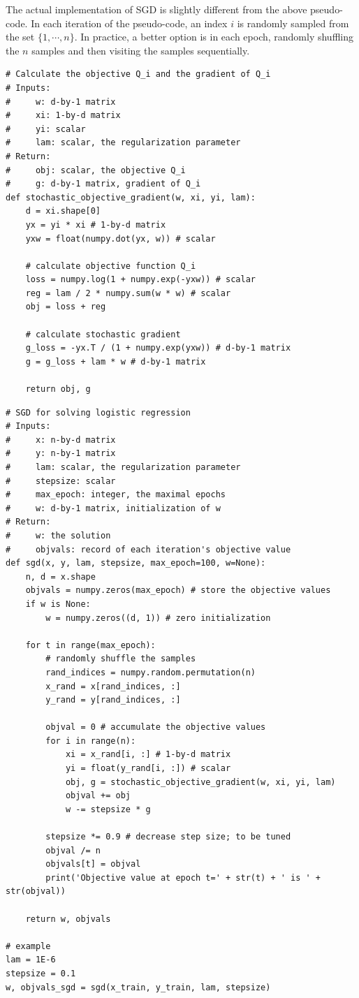 \documentclass[11pt]{article}
\numberwithin{equation}{section}
\begin{document}
The actual implementation of SGD is slightly different from the above pseudo-code.
In each iteration of the pseudo-code, an index $i$ is randomly sampled from the set $\{ 1, \cdots , n \}$.
In practice, a better option is in each epoch, randomly shuffling the $n$ samples and then visiting the samples sequentially.




\vspace{3mm}
\begin{lstlisting}
# Calculate the objective Q_i and the gradient of Q_i
# Inputs:
#     w: d-by-1 matrix
#     xi: 1-by-d matrix
#     yi: scalar
#     lam: scalar, the regularization parameter
# Return:
#     obj: scalar, the objective Q_i
#     g: d-by-1 matrix, gradient of Q_i
def stochastic_objective_gradient(w, xi, yi, lam):
	d = xi.shape[0]
	yx = yi * xi # 1-by-d matrix
	yxw = float(numpy.dot(yx, w)) # scalar
	
	# calculate objective function Q_i
	loss = numpy.log(1 + numpy.exp(-yxw)) # scalar
	reg = lam / 2 * numpy.sum(w * w) # scalar
	obj = loss + reg
	
	# calculate stochastic gradient
	g_loss = -yx.T / (1 + numpy.exp(yxw)) # d-by-1 matrix
	g = g_loss + lam * w # d-by-1 matrix
	
	return obj, g
\end{lstlisting}
\vspace{3mm}



\vspace{1mm}
\begin{lstlisting}
# SGD for solving logistic regression
# Inputs:
#     x: n-by-d matrix
#     y: n-by-1 matrix
#     lam: scalar, the regularization parameter
#     stepsize: scalar
#     max_epoch: integer, the maximal epochs
#     w: d-by-1 matrix, initialization of w
# Return:
#     w: the solution
#     objvals: record of each iteration's objective value
def sgd(x, y, lam, stepsize, max_epoch=100, w=None):
	n, d = x.shape
	objvals = numpy.zeros(max_epoch) # store the objective values
	if w is None:
		w = numpy.zeros((d, 1)) # zero initialization
	
	for t in range(max_epoch):
		# randomly shuffle the samples
		rand_indices = numpy.random.permutation(n)
		x_rand = x[rand_indices, :]
		y_rand = y[rand_indices, :]
		
		objval = 0 # accumulate the objective values
		for i in range(n):
			xi = x_rand[i, :] # 1-by-d matrix
			yi = float(y_rand[i, :]) # scalar
			obj, g = stochastic_objective_gradient(w, xi, yi, lam)
			objval += obj
			w -= stepsize * g
		
		stepsize *= 0.9 # decrease step size; to be tuned
		objval /= n
		objvals[t] = objval
		print('Objective value at epoch t=' + str(t) + ' is ' + str(objval))
	
	return w, objvals
	
# example
lam = 1E-6
stepsize = 0.1
w, objvals_sgd = sgd(x_train, y_train, lam, stepsize)
\end{lstlisting}
\vspace{3mm}
\end{document}
